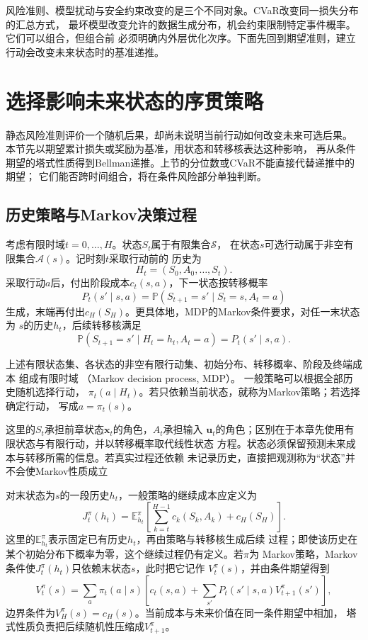 风险准则、模型扰动与安全约束改变的是三个不同对象。CVaR改变同一损失分布的汇总方式，
最坏模型改变允许的数据生成分布，机会约束限制特定事件概率。它们可以组合，但组合前
必须明确内外层优化次序。下面先回到期望准则，建立行动会改变未来状态时的基准递推。

\section{选择影响未来状态的序贯策略}
\label{sec:decision-dynamic-programming}

静态风险准则评价一个随机后果，却尚未说明当前行动如何改变未来可选后果。
本节先以期望累计损失或奖励为基准，用状态和转移核表达这种影响，
再从条件期望的塔式性质得到Bellman递推。上节的分位数或CVaR不能直接代替递推中的期望；
它们能否跨时间组合，将在条件风险部分单独判断。

\subsection{历史策略与Markov决策过程}
考虑有限时域\(t=0,\ldots,H\)。状态\(S_t\)属于有限集合\(\mathcal{S}\)，
在状态\(s\)可选行动属于非空有限集合\(\mathcal{A}(s)\)。记时刻\(t\)采取行动前的
历史为
\[
  H_t=(S_0,A_0,\ldots,S_t).
\]
采取行动\(a\)后，付出阶段成本\(c_t(s,a)\)，下一状态按转移概率
\[
  P_t(s'\mid s,a)
  =
  \mathbb{P}(S_{t+1}=s'\mid S_t=s,A_t=a)
\]
生成，末端再付出\(c_H(S_H)\)。更具体地，MDP的Markov条件要求，对任一末状态为
\(s\)的历史\(h_t\)，后续转移核满足
\[
  \mathbb{P}(S_{t+1}=s'\mid H_t=h_t,A_t=a)
  =
  P_t(s'\mid s,a).
\]
\begin{definition}[有限Markov决策过程与策略]
\label{def:decision-finite-mdp-policy}
上述有限状态集、各状态的非空有限行动集、初始分布、转移概率、阶段及终端成本
组成有限时域
（Markov decision process, MDP）。
一般策略可以根据全部历史随机选择行动，
\(\pi_t(a\mid H_t)\)。若只依赖当前状态，就称为Markov策略；若选择确定行动，
写成\(a=\pi_t(s)\)。
\end{definition}
这里的\(S_t\)承担前章状态\(\bm{x}_t\)的角色，\(A_t\)承担输入
\(\bm{u}_t\)的角色；区别在于本章先使用有限状态与有限行动，并以转移概率取代线性状态
方程。状态必须保留预测未来成本与转移所需的信息。若真实过程还依赖
未记录历史，直接把观测称为“状态”并不会使Markov性质成立

对末状态为\(s\)的一段历史\(h_t\)，一般策略的继续成本应定义为
\begin{equation}
  J_t^\pi(h_t)
  =
  \mathbb{E}_{h_t}^\pi\left[
    \sum_{k=t}^{H-1}c_k(S_k,A_k)+c_H(S_H)
  \right].
  \label{eq:decision-finite-policy-value}
\end{equation}
这里的\(\mathbb{E}_{h_t}^\pi\)表示固定已有历史\(h_t\)，再由策略与转移核生成后续
过程；即使该历史在某个初始分布下概率为零，这个继续过程仍有定义。若\(\pi\)为
Markov策略，Markov条件使\(J_t^\pi(h_t)\)只依赖末状态\(s\)，此时把它记作
\(V_t^\pi(s)\)，并由条件期望得到
\begin{equation}
  V_t^\pi(s)
  =
  \sum_a\pi_t(a\mid s)
  \left[
    c_t(s,a)
    +
    \sum_{s'}P_t(s'\mid s,a)V_{t+1}^\pi(s')
  \right],
  \label{eq:decision-policy-bellman}
\end{equation}
边界条件为\(V_H^\pi(s)=c_H(s)\)。当前成本与未来价值在同一条件期望中相加，
塔式性质负责把后续随机性压缩成\(V_{t+1}^\pi\)。

